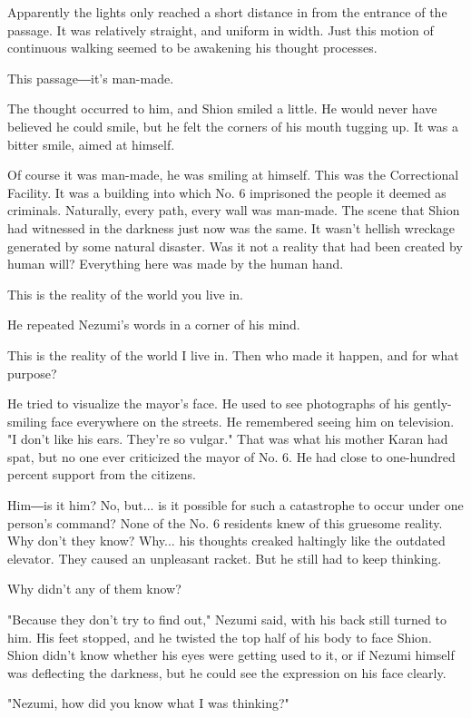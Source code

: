 Apparently the lights only reached a short distance in from the entrance
of the passage. It was relatively straight, and uniform in width. Just
this motion of continuous walking seemed to be awakening his thought
processes.

This passage―it's man-made.

The thought occurred to him, and Shion smiled a little. He would never
have believed he could smile, but he felt the corners of his mouth
tugging up. It was a bitter smile, aimed at himself.

Of course it was man-made, he was smiling at himself. This was the
Correctional Facility. It was a building into which No. 6 imprisoned the
people it deemed as criminals. Naturally, every path, every wall was
man-made. The scene that Shion had witnessed in the darkness just now
was the same. It wasn't hellish wreckage generated by some natural
disaster. Was it not a reality that had been created by human will?
Everything here was made by the human hand.

This is the reality of the world you live in.

He repeated Nezumi's words in a corner of his mind.

This is the reality of the world I live in. Then who made it happen, and
for what purpose?

He tried to visualize the mayor's face. He used to see photographs of
his gently-smiling face everywhere on the streets. He remembered seeing
him on television. "I don't like his ears. They're so vulgar." That was
what his mother Karan had spat, but no one ever criticized the mayor of
No. 6. He had close to one-hundred percent support from the citizens.

Him―is it him? No, but... is it possible for such a catastrophe to occur
under one person's command? None of the No. 6 residents knew of this
gruesome reality. Why don't they know? Why... his thoughts creaked
haltingly like the outdated elevator. They caused an unpleasant racket.
But he still had to keep thinking.

Why didn't any of them know?

"Because they don't try to find out," Nezumi said, with his back still
turned to him. His feet stopped, and he twisted the top half of his body
to face Shion. Shion didn't know whether his eyes were getting used to
it, or if Nezumi himself was deflecting the darkness, but he could see
the expression on his face clearly.

"Nezumi, how did you know what I was thinking?"

